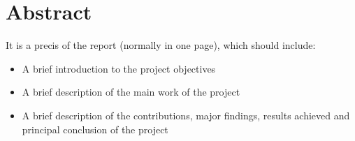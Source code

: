 
\section*{Abstract}
	It is a precis of the report (normally in one page), which should include:
\begin{itemize}
	\item A brief introduction to the project objectives
	\item A brief description of the main work of the project
	\item A brief description of the contributions, major findings, results achieved and principal conclusion of the project
\end{itemize}
